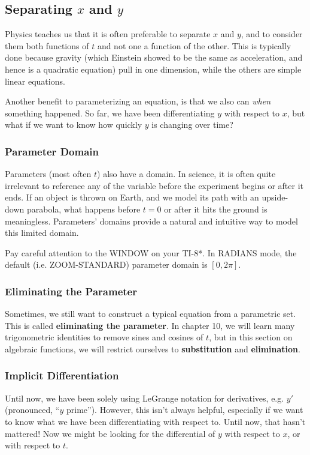 
\subsection{Separating $x$ and $y$}



Physics teaches us that it is often preferable to separate $x$ and $y$, and to
consider them both functions of $t$ and not one a function of the other.  This is 
typically done because gravity (which Einstein showed to be the same as 
acceleration, and hence is a quadratic equation) pull in one dimension, while
the others are simple linear equations.

Another benefit to parameterizing an equation, is that we also can \emph{when}
something happened.  So far, we have been differentiating $y$ with respect to 
$x$, but what if we want to know how quickly $y$ is changing over time?

\subsubsection{Parameter Domain}
Parameters (most often $t$) also have a domain.  In science, it is often quite
irrelevant to reference any of the variable before the experiment begins or
after it ends.  If an object is thrown on Earth, and we model its path with an
upside-down parabola, what happens before $t=0$ or after it hits the ground
is meaningless.  Parameters' domains provide a natural and intuitive way to
model this limited domain. 

Pay careful attention to the WINDOW on your TI-8*.  In RADIANS mode, the
default (i.e. ZOOM-STANDARD) parameter domain is $[0,2\pi]$.

\subsubsection{Eliminating the Parameter}
Sometimes, we still want to construct a typical equation from a parametric 
set.  This is called \textbf{eliminating the parameter}.  In chapter 10, we will
learn many trigonometric identities to remove sines and cosines of $t$, but in 
this section on algebraic functions, we will restrict ourselves to
\textbf{substitution} and \textbf{elimination}.

\subsubsection{Implicit Differentiation}
Until now, we have been solely using LeGrange notation for derivatives, e.g.
$y'$ (pronounced, ``$y$ prime'').  However, this isn't always helpful, especially
if we want to know what we have been differentiating with respect to.  Until now,
that hasn't mattered!  Now we might be looking for the differential of $y$ with 
respect to $x$, or with respect to $t$.


